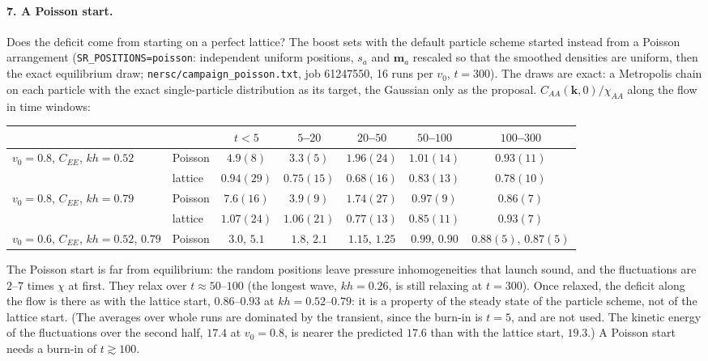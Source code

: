 \documentclass[11pt,aps,preprint,nofootinbib,superscriptaddress,tightenlines]{revtex4-2}
\let\oldparagraph\paragraph
\renewcommand{\paragraph}{\par\bigskip\oldparagraph}
\begin{document}
\paragraph{7. A Poisson start.}  Does the deficit come from starting on a perfect lattice?  The boost sets with the
default particle scheme started instead from a Poisson arrangement (\texttt{SR\_POSITIONS=poisson}: independent
uniform positions, $s_a$ and $\bm m_a$ rescaled so that the smoothed densities are uniform, then the exact
equilibrium draw; \texttt{nersc/campaign\_poisson.txt}, job 61247550, 16 runs per $v_0$, $t=300$).  The draws are exact: a
Metropolis chain on each particle with the exact single-particle distribution as its target, the Gaussian
only as the proposal.  $C_{AA}(\bm k,0)/\chi_{AA}$ along the flow in time windows:
\begin{center}
\begin{tabular}{llccccc}
\hline
 & & $t<5$ & $5$--$20$ & $20$--$50$ & $50$--$100$ & $100$--$300$ \\ \hline
$v_0=0.8$, $C_{EE}$, $kh=0.52$ & Poisson & $4.9(8)$ & $3.3(5)$ & $1.96(24)$ & $1.01(14)$ & $0.93(11)$ \\
 & lattice & $0.94(29)$ & $0.75(15)$ & $0.68(16)$ & $0.83(13)$ & $0.78(10)$ \\
$v_0=0.8$, $C_{EE}$, $kh=0.79$ & Poisson & $7.6(16)$ & $3.9(9)$ & $1.74(27)$ & $0.97(9)$ & $0.86(7)$ \\
 & lattice & $1.07(24)$ & $1.06(21)$ & $0.77(13)$ & $0.85(11)$ & $0.93(7)$ \\
$v_0=0.6$, $C_{EE}$, $kh=0.52$, $0.79$ & Poisson & $3.0$, $5.1$ & $1.8$, $2.1$ & $1.15$, $1.25$ & $0.99$, $0.90$ & $0.88(5)$, $0.87(5)$ \\
\hline
\end{tabular}
\end{center}
The Poisson start is far from equilibrium: the random positions leave pressure inhomogeneities that launch
sound, and the fluctuations are $2$--$7$ times $\chi$ at first.  They relax over $t\approx50$--$100$ (the longest wave,
$kh=0.26$, is still relaxing at $t=300$).  Once relaxed, the deficit along the flow is there as with the lattice start,
$0.86$--$0.93$ at $kh=0.52$--$0.79$: it is a property of the steady state of the particle scheme, not of the lattice start.
(The averages over whole runs are dominated by the transient, since the burn-in is $t=5$, and are not used.  The
kinetic energy of the fluctuations over the second half, $17.4$ at $v_0=0.8$, is nearer the predicted $17.6$ than with
the lattice start, $19.3$.)  A Poisson start needs a burn-in of $t\gtrsim100$.
\end{document}
